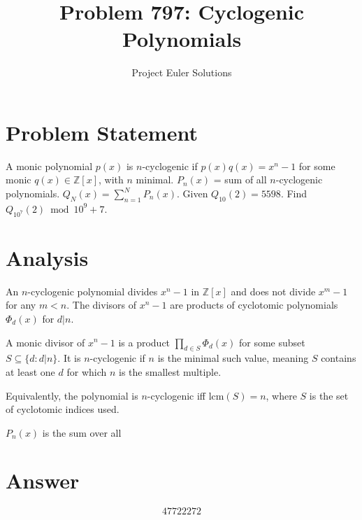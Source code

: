 \documentclass[11pt]{article}
\title{Problem 797: Cyclogenic Polynomials}
\author{Project Euler Solutions}
\date{}
\begin{document}
\maketitle
\section{Problem Statement}
A monic polynomial $p(x)$ is $n$-cyclogenic if $p(x)q(x) = x^n - 1$ for some monic $q(x) \in \mathbb{Z}[x]$, with $n$ minimal. $P_n(x)$ = sum of all $n$-cyclogenic polynomials. $Q_N(x) = \sum_{n=1}^N P_n(x)$. Given $Q_{10}(2) = 5598$. Find $Q_{10^7}(2) \bmod 10^9+7$.
\section{Analysis}
An $n$-cyclogenic polynomial divides $x^n - 1$ in $\mathbb{Z}[x]$ and does not divide $x^m - 1$ for any $m < n$. The divisors of $x^n - 1$ are products of cyclotomic polynomials $\Phi_d(x)$ for $d | n$.

A monic divisor of $x^n-1$ is a product $\prod_{d \in S} \Phi_d(x)$ for some subset $S \subseteq \{d : d|n\}$. It is $n$-cyclogenic if $n$ is the minimal such value, meaning $S$ contains at least one $d$ for which $n$ is the smallest multiple.

Equivalently, the polynomial is $n$-cyclogenic iff $\text{lcm}(S) = n$, where $S$ is the set of cyclotomic indices used.

$P_n(x)$ is the sum over all 
\section{Answer}

\[
\boxed{47722272}
\]
\end{document}
